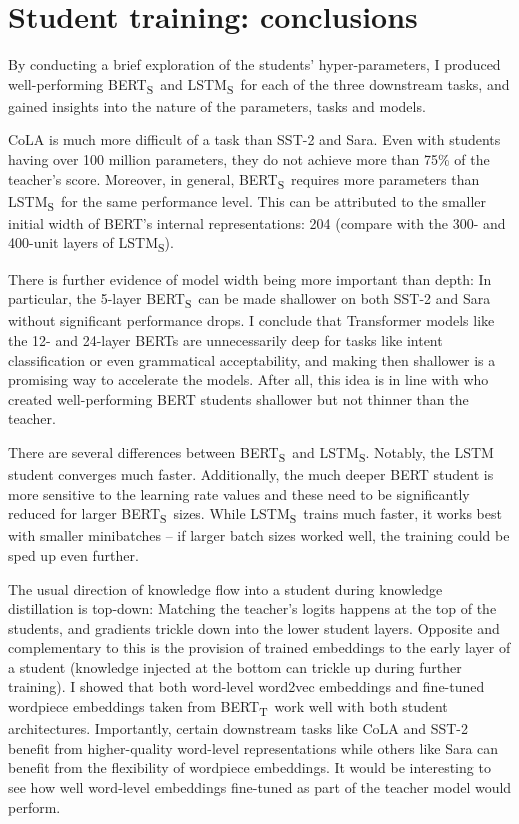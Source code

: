 \documentclass[bsc,frontabs,twoside,singlespacing,parskip,deptreport]{infthesis}
\def\BERTT{BERT\textsubscript{T}}
\def\BERTS{BERT\textsubscript{S}}
\def\LSTMS{LSTM\textsubscript{S}}
\begin{document}
{  \section{Student training: conclusions}{
    By conducting a brief exploration of the students' hyper-parameters, I produced well-performing \BERTS~and \LSTMS~for each of the three downstream tasks, and gained insights into the nature of the parameters, tasks and models.

    CoLA is much more difficult of a task than SST-2 and Sara. Even with students having over 100 million parameters, they do not achieve more than 75\% of the teacher's score. Moreover, in general, \BERTS~requires more parameters than \LSTMS~for the same performance level. This can be attributed to the smaller initial width of BERT's internal representations: 204 (compare with the 300- and 400-unit layers of \LSTMS).

    There is further evidence of model width being more important than depth: In particular, the 5-layer \BERTS~can be made shallower on both SST-2 and Sara without significant performance drops. I conclude that Transformer models like the 12- and 24-layer BERTs are unnecessarily deep for tasks like intent classification or even grammatical acceptability, and making then shallower is a promising way to accelerate the models. After all, this idea is in line with \citet{Sanh_2019} who created well-performing BERT students shallower but not thinner than the teacher.

    There are several differences between \BERTS~and \LSTMS. Notably, the LSTM student converges much faster. Additionally, the much deeper BERT student is more sensitive to the learning rate values and these need to be significantly reduced for larger \BERTS~sizes. While \LSTMS~trains much faster, it works best with smaller minibatches -- if larger batch sizes worked well, the training could be sped up even further.

    The usual direction of knowledge flow into a student during knowledge distillation is top-down: Matching the teacher's logits happens at the top of the students, and gradients trickle down into the lower student layers.
    Opposite and complementary to this is the provision of trained embeddings to the early layer of a student (knowledge injected at the bottom can trickle up during further training).
    I showed that both word-level word2vec embeddings and fine-tuned wordpiece embeddings taken from \BERTT~work well with both student architectures. Importantly, certain downstream tasks like CoLA and SST-2 benefit from higher-quality word-level representations while others like Sara can benefit from the flexibility of wordpiece embeddings. It would be interesting to see how well word-level embeddings fine-tuned as part of the teacher model would perform.

}}
\end{document}
